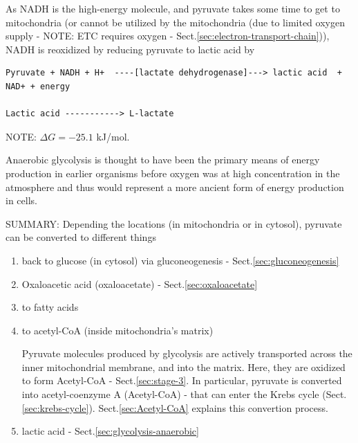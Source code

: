 As NADH is the high-energy molecule, and pyruvate takes some time to get to
mitochondria (or cannot be utilized by the mitochondria (due to limited oxygen
supply - NOTE: ETC requires oxygen - Sect.\ref{sec:electron-transport-chain})),
NADH is reoxidized by reducing pyruvate to lactic acid by

{\tiny
\begin{verbatim}
Pyruvate + NADH + H+  ----[lactate dehydrogenase]---> lactic acid  + NAD+ + energy

Lactic acid -----------> L-lactate
\end{verbatim}
}

NOTE: $\Delta G = -25.1$ kJ/mol.


\begin{mdframed}
Anaerobic glycolysis is thought to have been the primary means of energy
production in earlier organisms before oxygen was at high concentration in the
atmosphere and thus would represent a more ancient form of energy production in
cells.
\end{mdframed}


%


SUMMARY: Depending the locations (in mitochondria or in cytosol), pyruvate can
be converted to different things
\begin{enumerate}

  \item back to glucose (in cytosol) via gluconeogenesis -
  Sect.\ref{sec:gluconeogenesis}

  \item Oxaloacetic acid (oxaloacetate) - Sect.\ref{sec:oxaloacetate}

  \item to fatty acids

  \item to acetyl-CoA (inside mitochondria's matrix)

Pyruvate molecules produced by glycolysis are actively transported across the
inner mitochondrial membrane, and into the matrix. Here, they are oxidized to
form Acetyl-CoA - Sect.\ref{sec:stage-3}. In particular, pyruvate is converted
into acetyl-coenzyme A (Acetyl-CoA) - that can enter the Krebs cycle
(Sect.\ref{sec:krebs-cycle}). Sect.\ref{sec:Acetyl-CoA} explains this convertion
process.

  \item lactic acid - Sect.\ref{sec:glycolysis-anaerobic}

\end{enumerate}




